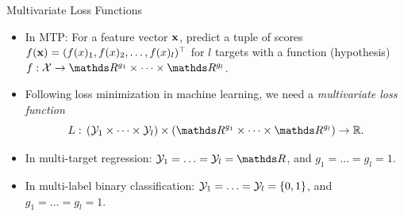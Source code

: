 \documentclass[11pt,compress,t,notes=noshow, xcolor=table]{beamer}
\begin{document}



\sloppy


\begin{frame}{Multivariate Loss Functions}
	\begin{itemize}
		\item In MTP: For a feature vector $\mathbf{x}$, predict a tuple of scores $f(\mathbf{x}) = (f(x)_1, f(x)_2, \ldots, f(x)_l)^\top$ for $l$ targets with a function (hypothesis) $f: \Xspace \rightarrow \R^{g_1} \times \cdots \times \R^{g_l} $.
        
		\item Following loss minimization in machine learning, we need a \emph{multivariate loss function} 
		$$
		L: \, (\Yspace_1 \times \cdots \times \Yspace_l) \times (\R^{g_1} \times \cdots \times \R^{g_l}) \rightarrow \mathbb{R}.
		$$ 

        \item In multi-target regression: $\Yspace_1 = \ldots = \Yspace_l = \R$, and $g_1 = \ldots = g_l = 1$.

        \item In multi-label binary classification: $\mathcal{Y}_1 =  \ldots = \mathcal{Y}_l = \{0, 1\}$, and $g_1 = \ldots = g_l = 1$. %
	\end{itemize}
	
\end{frame}
\end{document}
